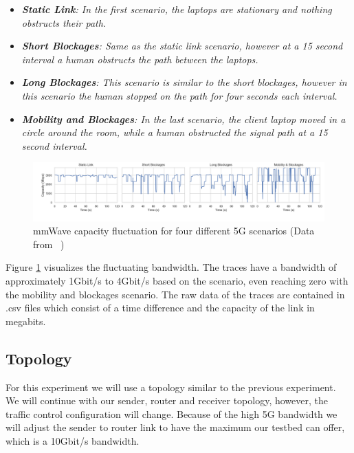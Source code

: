 \documentclass[a4paper,english, 12pt]{report}
\begin{document}
\begin{itemize}
  \item \textit{\textbf{Static Link}: In the first scenario, the laptops are stationary and nothing obstructs their path.}
  \item \textit{\textbf{Short Blockages}: Same as the static link scenario, however at a 15 second interval a human obstructs the path between the laptops.}
  \item \textit{\textbf{Long Blockages}: This scenario is similar to the short blockages, however in this scenario the human stopped on the path for four seconds each interval.}
  \item \textit{\textbf{Mobility and Blockages}: In the last scenario, the client laptop moved in a circle around the room, while a human obstructed the signal path at a 15 second interval.}
\end{itemize}



\begin{figure}[h!] %
	\centering
	\includegraphics[scale=0.33]{../diagrams/witestlab/mmwave_cap2.png}
  	\caption{mmWave capacity fluctuation for four different 5G scenarios (Data from ~\cite{Srivastava_Fund_Panwar_2020})}
  	\label{fig:witestlab_graph1}
\end{figure}

Figure \ref{fig:witestlab_graph1} visualizes the fluctuating bandwidth. The traces have a bandwidth of approximately 1Gbit/s to 4Gbit/s based on the scenario, even reaching zero with the mobility and blockages scenario. The raw data of the traces are contained in .csv files which consist of a time difference and the capacity of the link in megabits.


\subsection{Topology}
For this experiment we will use a topology similar to the previous experiment. We will continue with our sender, router and receiver topology, however, the traffic control configuration will change. Because of the high 5G bandwidth we will adjust the sender to router link to have the maximum our testbed can offer, which is a 10Gbit/s bandwidth.\\
\end{document}
